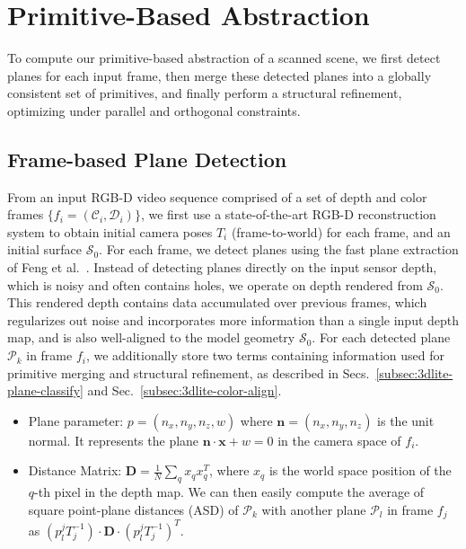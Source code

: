 \section{Primitive-Based Abstraction}
\label{sec:3dlite-plane-abstraction}

To compute our primitive-based abstraction of a scanned scene, we first detect planes for each input frame, then merge these detected planes into a globally consistent set of primitives, and finally perform a structural refinement, optimizing under parallel and orthogonal constraints.

\subsection{Frame-based Plane Detection}
\label{subsec:3dlite-plane-detect}

From an input RGB-D video sequence comprised of a set of depth and color frames $\{f_i = (\mathcal{C}_i, \mathcal{D}_i)\}$, we first use a state-of-the-art RGB-D reconstruction system to obtain initial camera poses $T_i$ (frame-to-world) for each frame, and an initial surface $\mathcal{S}_0$.
For each frame, we detect planes using the fast plane extraction of Feng et al.~\cite{feng2014fast}. 
Instead of detecting planes directly on the input sensor depth, which is noisy and often contains holes, we operate on depth rendered from $\mathcal{S}_0$.
This rendered depth contains data accumulated over previous frames, which regularizes out noise and incorporates more information than a single input depth map, and is also well-aligned to the model geometry $\mathcal{S}_0$.
For each detected plane $\mathcal{P}_k$ in frame $f_i$, we additionally store two terms containing information used for primitive merging and structural refinement, as described in Secs.~\ref{subsec:3dlite-plane-classify} and Sec.~\ref{subsec:3dlite-color-align}.
\begin{itemize}
    \item Plane parameter: $p=(n_x,n_y,n_z,w)$ where $\mathbf{n} = (n_x,n_y,n_z)$ is the unit normal. It represents the plane $\mathbf{n}\cdot \mathbf{x} + w=0$ in the camera space of $f_i$. 
    \item Distance Matrix: $\mathbf{D} = \frac{1}{N}\sum_{q} x_qx_q^T$, where $x_q$ is the world space position of the $q$-th pixel in the depth map. 
    We can then easily compute the average of square point-plane distances (ASD) of $\mathcal{P}_k$ with another plane $\mathcal{P}_l$ in frame $f_j$ as $(p_l^jT_j^{-1})\cdot \mathbf{D}\cdot (p_l^jT_j^{-1})^T$. 
\end{itemize}

